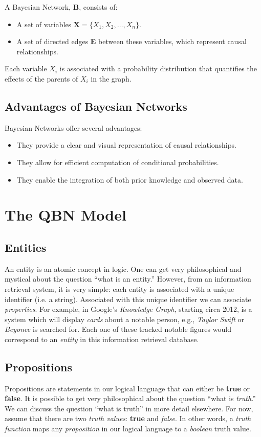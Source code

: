 \documentclass[12pt]{article}
\begin{document}
A Bayesian Network, \textbf{B}, consists of:

\begin{itemize}
    \item A set of variables $\textbf{X} = \{X_1, X_2, \ldots, X_n\}$.
    \item A set of directed edges \textbf{E} between these variables, which represent causal relationships.
\end{itemize}

Each variable \(X_i\) is associated with a probability distribution that quantifies the effects of the parents of \(X_i\) in the graph.

\subsection{Advantages of Bayesian Networks}

Bayesian Networks offer several advantages:

\begin{itemize}
    \item They provide a clear and visual representation of causal relationships.
    \item They allow for efficient computation of conditional probabilities.
    \item They enable the integration of both prior knowledge and observed data.
\end{itemize}
\section{The QBN Model}
\subsection{Entities}
An entity is an atomic concept in logic.
One can get very philosophical and mystical about the question ``what is an entity.''
However, from an information retrieval system, it is very simple: each entity is associated with a unique identifier (i.e. a string).
Associated with this unique identifier we can associate {\em properties}.
For example, in Google's {\em Knowledge Graph}, starting circa 2012, is a system which will display {\em cards} about a notable person, e.g., {\em Taylor Swift} or {\em Beyonce} is searched for.
Each one of these tracked notable figures would correspond to an {\em entity} in this information retrieval database.

\subsection{Propositions}
Propositions are statements in our logical language that can either be {\bf true} or {\bf false}.
It is possible to get very philosophical about the question ``what is {\em truth}.''
We can discuss the question ``what is truth'' in more detail elsewhere.
For now, assume that there are two {\em truth values}: {\bf true} and {\em false}.
In other words, a {\em truth function} maps any {\em proposition} in our logical language to a {\em boolean} truth value.
\end{document}
